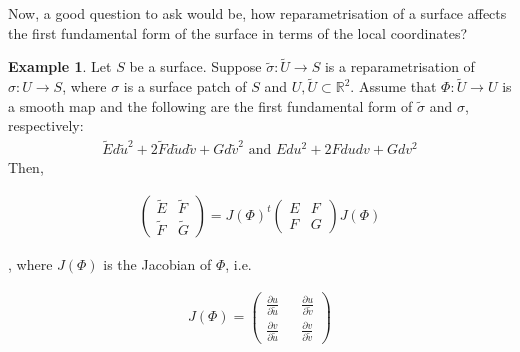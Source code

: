 \documentclass{article}
\theoremstyle{plain}
\theoremstyle{definition}
\newtheorem{example}{Example}
\theoremstyle{remark}
\newcommand{\R}{\mathbb{R}}
\begin{document}
Now, a good question to ask would be, how reparametrisation of a surface affects the first fundamental form of the surface in terms of the local coordinates?

\begin{example}
    Let \(S\) be a surface. Suppose \(\tilde{\sigma}: \tilde{U} \rightarrow S \) is a reparametrisation of \(\sigma: U \rightarrow S \), where \(\sigma\) is a surface patch of \(S\) and \( U, \tilde{U} \subset \R^2 \).
    Assume that \( \Phi: \tilde{U} \rightarrow U\) is a smooth map and the following are the first fundamental form of \(\tilde{\sigma}\) and \(\sigma\), respectively:
    \begin{align*}
        \tilde{E} d\tilde{u}^2 + 2\tilde{F} d\tilde{u} d\tilde{v} + G d\tilde{v}^2
        \text{  and  }
        E du^2 + 2F du dv + G dv^2
    \end{align*}
    Then,
\end{example}
\begin{align} \label{eq: reparmetrisation affect on the first fundamental form}
    \begin{pmatrix}
        \tilde{E} & \tilde{F} \\
        \tilde{F} & \tilde{G}
    \end{pmatrix}
    =
    J(\Phi)^t
    \begin{pmatrix}
        E & F \\
        F & G
    \end{pmatrix}
    J(\Phi)
\end{align}

, where \( J(\Phi) \) is the Jacobian of \(\Phi\), i.e.

\begin{align*}
    J(\Phi) =
    \begin{pmatrix}
        \frac{\partial u}{ \partial \tilde{u}} &  & \frac{\partial u}{ \partial \tilde{v}} \\
        \frac{\partial v}{ \partial \tilde{u}} &  & \frac{\partial v}{ \partial \tilde{v}}
    \end{pmatrix}
\end{align*}
\end{document}
